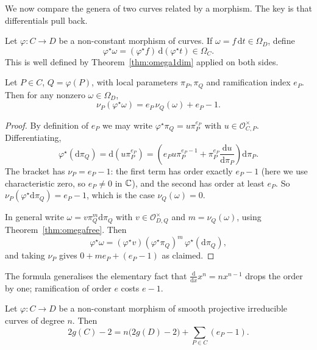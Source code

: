 \documentclass[a4paper]{scrartcl}
\newcommand{\Oh}{\mathcal{O}}
\newcommand{\dee}{\mathrm{d}}
\begin{document}
We now compare the genera of two curves related by a morphism. The key is that differentials pull back.

Let $\varphi \colon C \to D$ be a non-constant morphism of curves. If $\omega = f\,\dee t \in \Omega_D$, define
$$\varphi^\star\omega = (\varphi^\star f)\,\dee(\varphi^\star t) \in \Omega_C.$$
This is well defined by Theorem~\ref{thm:omega1dim} applied on both sides.

\begin{lemma}\label{lem:pullbackdiff}
	Let $P \in C$, $Q = \varphi(P)$, with local parameters $\pi_P,\pi_Q$ and ramification index $e_P$. Then for any nonzero $\omega \in \Omega_D$,
	$$\nu_P(\varphi^\star\omega) = e_P\,\nu_Q(\omega) + e_P - 1.$$
\end{lemma}

\begin{proof}
	By definition of $e_P$ we may write $\varphi^\star\pi_Q = u\pi_P^{e_P}$ with $u \in \Oh_{C,P}^\times$. Differentiating,
	$$\varphi^\star(\dee\pi_Q) = \dee(u\pi_P^{e_P}) = \left(e_Pu\pi_P^{e_P-1} + \pi_P^{e_P}\frac{\dee u}{\dee \pi_P}\right)\dee\pi_P.$$
	The bracket has $\nu_P = e_P - 1$: the first term has order exactly $e_P-1$ (here we use characteristic zero, so $e_P \neq 0$ in $\mathbb{C}$), and the second has order at least $e_P$. So $\nu_P(\varphi^\star\dee\pi_Q) = e_P-1$, which is the case $\nu_Q(\omega) = 0$.

	In general write $\omega = v\pi_Q^m\dee\pi_Q$ with $v \in \Oh_{D,Q}^\times$ and $m = \nu_Q(\omega)$, using Theorem~\ref{thm:omegafree}. Then
	$$\varphi^\star\omega = (\varphi^\star v)(\varphi^\star\pi_Q)^m\,\varphi^\star(\dee\pi_Q),$$
	and taking $\nu_P$ gives $0 + me_P + (e_P-1)$ as claimed.
\end{proof}

The formula generalises the elementary fact that $\frac{\dee}{\dee x}x^n = nx^{n-1}$ drops the order by one; ramification of order $e$ costs $e-1$.

\begin{theorem}\label{thm:RH}
	Let $\varphi \colon C \to D$ be a non-constant morphism of smooth projective irreducible curves of degree $n$. Then
	$$2g(C) - 2 = n\big(2g(D) - 2\big) + \sum_{P \in C}(e_P - 1).$$
\end{theorem}
\end{document}
